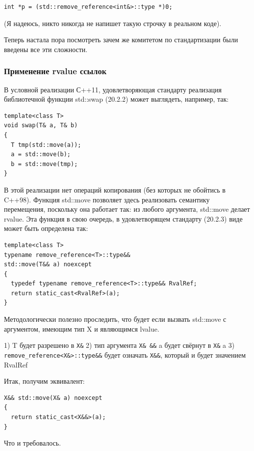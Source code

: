 \documentclass[a4paper,12pt,oneside]{article}
\begin{document}
\begin{lstlisting}
int *p = (std::remove_reference<int&>::type *)0;
\end{lstlisting}

(Я надеюсь, никто никогда не напишет такую строчку в реальном коде).

Теперь настала пора посмотреть зачем же комитетом по стандартизации были введены все эти сложности.

\subsubsection{Применение rvalue ссылок}

В условной реализации С++11, удовлетворяющая стандарту реализация библиотечной функции std::swap (20.2.2) может выглядеть, например, так:

\begin{lstlisting}
template<class T> 
void swap(T& a, T& b) 
{ 
  T tmp(std::move(a));
  a = std::move(b); 
  b = std::move(tmp);
} 
\end{lstlisting}

В этой реализации нет операций копирования (без которых не обойтись в C++98). Функция std::move позволяет здесь реализовать семантику перемещения, поскольку она работает так: из любого аргумента, std::move делает rvalue. Эта функция в свою очередь, в удовлетворящем стандарту (20.2.3) виде может быть определена так:

\begin{lstlisting}
template<class T> 
typename remove_reference<T>::type&&
std::move(T&& a) noexcept
{
  typedef typename remove_reference<T>::type&& RvalRef;
  return static_cast<RvalRef>(a);
} 
\end{lstlisting}

Методологически полезно проследить, что будет если вызвать std::move с аргументом, имеющим тип X и являющимся lvalue.

1) T будет разрешено в \lstinline!X&!
2) тип аргумента \lstinline!X& &&! a будет свёрнут в \lstinline!X&! a
3) \lstinline!remove_reference<X&>::type&&! будет означать \lstinline!X&&!, который и будет значением RvalRef

Итак, получим эквивалент:

\begin{lstlisting}
X&& std::move(X& a) noexcept
{  
  return static_cast<X&&>(a);
}
\end{lstlisting}

Что и требовалось.
\end{document}
